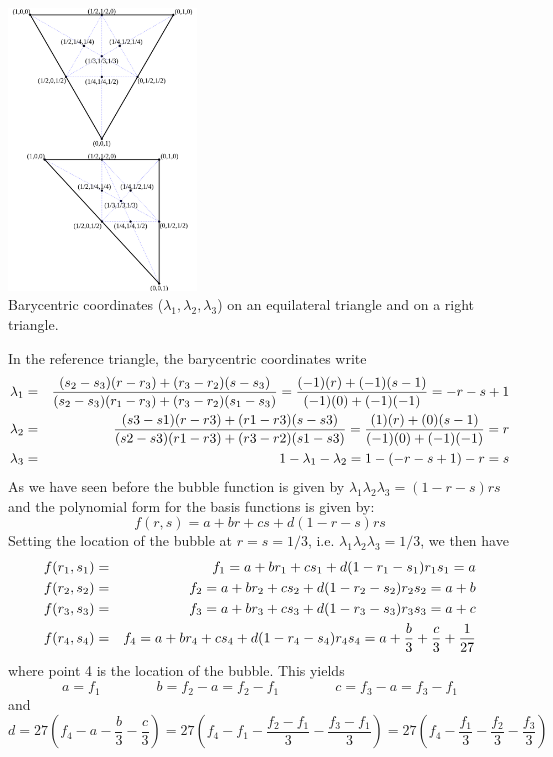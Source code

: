 \begin{center}
\includegraphics[width=5cm]{images/mini/barycoord}\\
{\small Barycentric coordinates ($\lambda _{1},\lambda _{2},\lambda _{3}$) on an equilateral triangle and on a right triangle.}
\end{center}

In the reference triangle, the barycentric coordinates write
\begin{eqnarray}
\lambda_1 &=& \frac{(s_2-s_3)(r-r_3)+(r_3-r_2)(s-s_3)}{(s_2-s_3)(r_1-r_3)+(r_3-r_2)(s_1-s_3)} = \frac{(-1)(r)+(-1)(s-1)}{(-1)(0)+(-1)(-1)} = -r-s+1  \nonumber\\
\lambda_2 &=& \frac{(s3-s1)(r-r3)+(r1-r3)(s-s3)}{(s2-s3)(r1-r3)+(r3-r2)(s1-s3)} = \frac{(1)(r)+(0)(s-1)}{(-1)(0)+(-1)(-1)} = r \nonumber\\
\lambda_3 &=& 1-\lambda_1-\lambda_2 = 1 - (-r-s+1) - r = s \nonumber
\end{eqnarray}
As we have seen before the bubble function is given by $\lambda_1\lambda_2\lambda_3 = (1-r-s)rs$
and the polynomial form for the basis functions is given by:
\[
f(r,s) =a+br+cs + d (1-r-s)rs
\]
Setting the location of the bubble at $r=s=1/3$, i.e. $\lambda_1\lambda_2\lambda_3 = 1/3$, 
we then have 
\begin{eqnarray}
f(r_1,s_1)&=&f_1 = a+br_1+cs_1 + d (1-r_1-s_1)r_1s_1 = a \nonumber\\
f(r_2,s_2)&=&f_2 = a+br_2+cs_2 + d (1-r_2-s_2)r_2s_2 = a + b \nonumber\\
f(r_3,s_3)&=&f_3 = a+br_3+cs_3 + d (1-r_3-s_3)r_3s_3 = a + c \nonumber\\
f(r_4,s_4)&=&f_4 = a+br_4+cs_4 + d (1-r_4-s_4)r_4s_4 = a + \frac{b}{3} + \frac{c}{3} + \frac{1}{27} \nonumber
\end{eqnarray}
where point 4 is the location of the bubble.
This yields
\[
a=f_1 
\quad\quad\qquad
b=f_2-a = f_2-f_1
\quad\quad\qquad
c=f_3-a = f_3-f_1
\]
and
\[
d=27(f_4-a-\frac{b}{3} - \frac{c}{3}) = 27 (f_4 - f_1 - \frac{f_2-f_1}{3} - \frac{f_3-f_1}{3} )
=27(f_4 - \frac{f_1}{3}  - \frac{f_2}{3}  - \frac{f_3}{3} )
\] 

